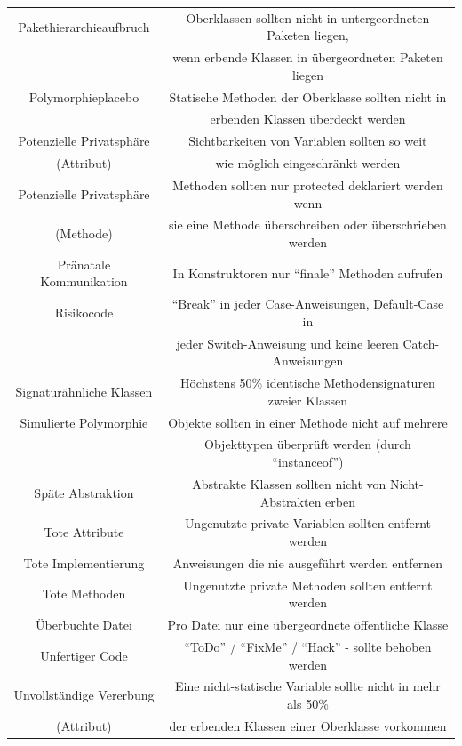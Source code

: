 \documentclass[da,ngerman]{stthesis}
\begin{document}
\begin{center}
\begin{longtabu}{|c|c|}
						\hline
						Pakethierarchieaufbruch & Oberklassen sollten nicht in untergeordneten Paketen liegen, \\ & wenn erbende Klassen in übergeordneten Paketen liegen \\
						\hline
						Polymorphieplacebo & Statische Methoden der Oberklasse sollten nicht in \\ & erbenden Klassen überdeckt werden \\
						\hline
						Potenzielle Privatsphäre & Sichtbarkeiten von Variablen sollten so weit \\ (Attribut) & wie möglich eingeschränkt werden \\
\hline
						Potenzielle Privatsphäre & Methoden sollten nur protected deklariert werden wenn \\ (Methode) & sie eine Methode überschreiben oder überschrieben werden \\
						\hline
						Pränatale Kommunikation & In Konstruktoren nur "`finale"' Methoden aufrufen \\
						\hline
						Risikocode & "`Break"' in jeder Case-Anweisungen, Default-Case in \\ & jeder Switch-Anweisung und keine leeren Catch-Anweisungen \\
						\hline
						Signaturähnliche Klassen & Höchstens 50\% identische Methodensignaturen zweier Klassen \\
						\hline
						Simulierte Polymorphie & Objekte sollten in einer Methode nicht auf mehrere \\ & Objekttypen überprüft werden (durch "`instanceof"') \\
						\hline
						Späte Abstraktion & Abstrakte Klassen sollten nicht von Nicht-Abstrakten erben \\
						\hline
						Tote Attribute & Ungenutzte private Variablen sollten entfernt werden \\
						\hline
						Tote Implementierung & Anweisungen die nie ausgeführt werden entfernen \\
						\hline
						Tote Methoden & Ungenutzte private Methoden sollten entfernt werden \\
						\hline
						Überbuchte Datei & Pro Datei nur eine übergeordnete öffentliche Klasse \\
						\hline
						Unfertiger Code & "`ToDo"' / "`FixMe"' / "`Hack"' -  sollte behoben werden \\
						\hline
						Unvollständige Vererbung & Eine nicht-statische Variable sollte nicht in mehr als 50\% \\ (Attribut) & der erbenden Klassen einer Oberklasse vorkommen \\

\end{longtabu}
\end{center}
\end{document}
